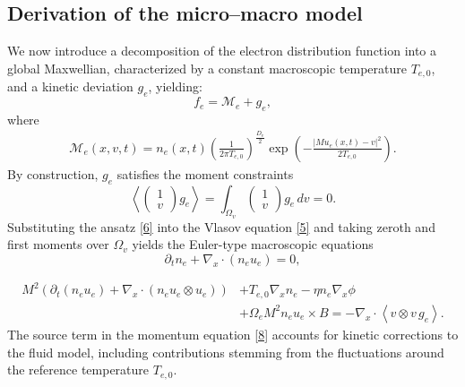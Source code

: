 \documentclass[pdflatex,final,10pt]{article}
\newcommand{\Fabrice}[1]{#1}
\begin{document}
\subsection{Derivation of the micro--macro model}
We now introduce \Fabrice{a decomposition of the electron distribution function into a global Maxwellian, characterized by a constant macroscopic temperature $T_{e,0}$, and a kinetic deviation $g_e$, yielding:}
\begin{equation} \label{6}
    f_e=\mathcal{M}_{e}+g_{e},
\end{equation}
where
\begin{align}\label{eq:Maxwellian:adim}
     \mathcal{M}_{e}\Fabrice{(x,v,t)}=n_e(x,t)\left(\frac{1}{2\pi T_{e,0}}\right)^{\frac{D_v}{2}}
    \exp\left( -\frac{|Mu_e(x,t)-v|^{2}}{2T_{e,0}}\right).
\end{align}
By construction, $g_e$ satisfies the moment constraints
\begin{equation*}
    \left\langle
    \begin{pmatrix}
        1\\
        v
    \end{pmatrix} g_{e}
    \right\rangle
    =\int_{\Omega_v}\begin{pmatrix}1\\v\end{pmatrix} g_{e}\,dv=0.
\end{equation*}
Substituting the \Fabrice{ansatz \eqref{6} into the Vlasov equation} \eqref{5} and taking zeroth and first moments over $\Omega_v$ yields the Euler-type macroscopic equations
\begin{equation}
    \partial_t n_e+\nabla_x\cdot(n_eu_e)=0,
    \label{7}
\end{equation}

\begin{equation}
\begin{aligned}
    M^2\left(
        \partial_t(n_eu_e)
        +\nabla_x\cdot(n_eu_e\otimes u_e)
    \right)
    &+T_{e,0}\nabla_x n_e
    -\eta n_e\nabla_x\phi
    \\
    \qquad
    &+\Omega_eM^2n_eu_e\times B
    =
    -\nabla_x\cdot
    \left\langle v\otimes v\,g_e\right\rangle.
\end{aligned}
\label{8}
\end{equation}
\Fabrice{The source term in the momentum equation \eqref{8} accounts for kinetic corrections to the fluid model, including contributions stemming from the fluctuations around the reference temperature $T_{e,0}$.}
\end{document}
